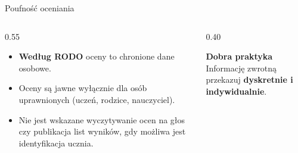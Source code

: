 \documentclass[10pt, aspectratio=169]{beamer}
\begin{document}
\begin{frame}{Poufność oceniania}
    \vspace{0.4cm}
    \begin{columns}[T]
        \begin{column}{0.55\textwidth}
        \pause
            \begin{tcolorbox}[moderncard]
                \small
                
                \begin{itemize}
                    \item \textbf{Według RODO} oceny to chronione dane osobowe.
                    \item Oceny są jawne wyłącznie dla osób uprawnionych (uczeń, rodzice, nauczyciel).
                    \item Nie jest wskazane wyczytywanie ocen na głos czy publikacja list wyników, gdy możliwa jest identyfikacja ucznia.
                \end{itemize}
            \end{tcolorbox}
        \end{column}
        \pause
        \begin{column}{0.40\textwidth}
            \begin{tcolorbox}[tealcard]
                \centering
                \textbf{\textcolor{accentTeal}{Dobra praktyka}}\\[0.3cm]
                \small
                Informację zwrotną przekazuj \textbf{dyskretnie i indywidualnie}.
            
            \end{tcolorbox}
        \end{column}
    \end{columns}
\end{frame}
\end{document}
